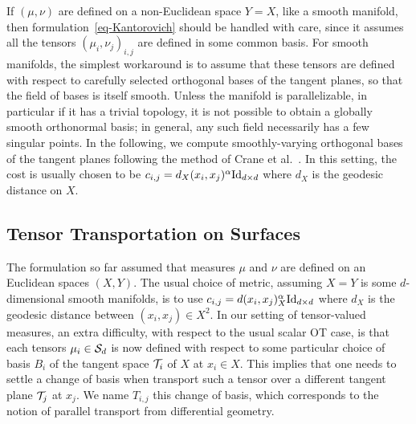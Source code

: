 \begin{rem}
	If $(\mu,\nu)$ are defined on a non-Euclidean space $Y=X$, like a smooth manifold, then formulation~\eqref{eq-Kantorovich} should be handled with care, since it assumes all the tensors $(\mu_i,\nu_j)_{i,j}$ are defined %
	in some common basis. 
	For smooth manifolds, the simplest workaround is to assume that these tensors are defined with respect to carefully selected orthogonal bases of the tangent planes, so that the field of bases is itself smooth. Unless the manifold is parallelizable, in particular if it has a trivial topology, it is not possible to obtain a globally smooth orthonormal basis; in general, any such field necessarily has a few singular points. In the following, we compute smoothly-varying orthogonal bases of the tangent planes following the method of Crane et al.~. 
	In this setting, the cost is usually chosen to be $c_{i,j} = d_X(x_i,x_j)^\alpha \mathrm{Id}_{d \times d}$ where $d_X$ is the geodesic distance on $X$. 
\end{rem}

\subsection{Tensor Transportation on Surfaces}



The formulation so far assumed that measures $\mu$ and $\nu$ are defined on an Euclidean spaces $(X,Y)$. The usual choice of metric, assuming $X=Y$ is some $d$-dimensional smooth manifolds, is to use $c_{i,j} = d(x_i,x_j)_X^\alpha \mathrm{Id}_{d \times d}$ where $d_X$ is the geodesic distance between $(x_i,x_j) \in X^2$. 
%
In our setting of tensor-valued measures, an extra difficulty, with respect to the usual scalar OT case, is that each tensors $\mu_i \in \mathcal{S}_d$ is now defined with respect to some particular choice of basis $B_i$ of the tangent space $\mathcal{T}_i$ of $X$ at $x_i \in X$. 
% 
This implies that one needs to settle a change of basis when transport such a tensor over a different tangent plane $\mathcal{T}_j$ at $x_j$. We name $T_{i,j}$ this change of basis, which corresponds to the notion of parallel transport from differential geometry.

